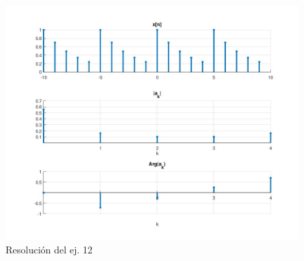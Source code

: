 \documentclass[10pt,a4paper]{article}
\begin{document}
\begin{enumerate}
\begin{enumerate}
	\begin{figure}[h]
		\begin{center}
			\includegraphics[width=16cm]{tp8_ej12.jpg}
		\end{center}
		\caption{Resolución del ej. 12}
		\label{fig:ej_12}
	\end{figure}
	
\end{enumerate}




\end{enumerate}
\end{document}
